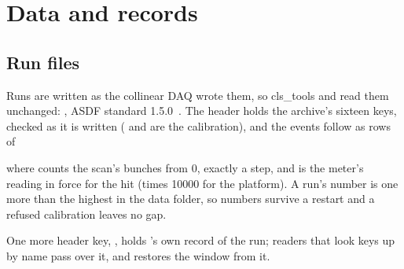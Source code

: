 \section{Data and records}
\label{sec:data}

\subsection{Run files}

Runs are written as the collinear DAQ wrote them, so cls\_tools and \denis{} read them
unchanged: , ASDF standard
1.5.0~\cite{asdf}. The header holds the archive's sixteen keys, checked as it is written
( and  are the calibration), and the events follow as rows of

\begin{center}
\end{center}

\noindent where  counts the scan's bunches from 0, exactly
 a step, and  is the meter's reading in force for the
hit (times 10000 for the platform). A run's number is one more than the highest in the data
folder, so numbers survive a restart and a refused calibration leaves no gap.

One more header key, , holds \oracle{}'s own record of the run; readers that
look keys up by name pass over it, and  restores the window from
it.

